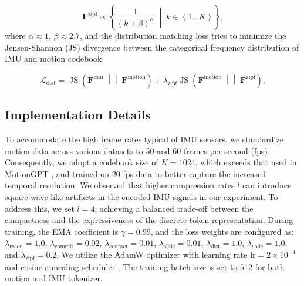 \begin{equation}
    \mathbf{F}^{\text{zipf}} \propto \left\{\frac{1}{(k+\beta)^\alpha} \;\middle|\; k\in\left\{1\dots K\right\}\right\}\text{,}
\label{eq:zipf_law}
\end{equation}
where $\alpha\approx 1$, $\beta\approx2.7$, and the distribution matching loss tries to minimize the Jensen-Shannon (JS) divergence between the categorical frequency distribution of IMU and motion codebook
\begin{small}
\begin{equation}
    \mathcal L_{\text{dist}} = \operatorname{JS}\left({\mathbf{F}^\text{imu}} \;\middle|\middle|\; {\mathbf{F}^{\text{motion}}}\right) + \lambda_{\text{zipf}}\operatorname{JS}\left({\mathbf{F}^\text{motion}} \;\middle|\middle|\; {\mathbf{F}^{\text{zipf}}}\right)\text{.}
\label{eq:distribution_matching}
\end{equation}
\end{small}

\subsection{Implementation Details}
\label{sec:implementation_detail_part1}
To accommodate the high frame rates typical of IMU sensors, we standardize motion data across various datasets to 50 and 60 frames per second (fps). Consequently, we adopt a codebook size of $K=1024$, which exceeds that used in MotionGPT \cite{jiang2023motiongpt}, and trained on 20 fps data to better capture the increased temporal resolution. We observed that higher compression rates $l$ can introduce square-wave-like artifacts in the encoded IMU signals in our experiment. To address this, we set $l=4$, achieving a balanced trade-off between the compactness and the expressiveness of the discrete token representation. During training, the EMA coefficient is $\gamma=0.99$, and the loss weights are configured as: $\lambda_{\textrm{recon}}=1.0$, $\lambda_{\textrm{commit}}=0.02$, $\lambda_{\textrm{contact}}=0.01$, $\lambda_{\textrm{slide}}=0.01$, $\lambda_{\textrm{dist}}=1.0$, $\lambda_{\textrm{code}}=1.0$, and $\lambda_{\textrm{zipf}}=0.2$.
We utilize the AdamW optimizer \cite{loshchilov2017decoupled} with learning rate $\textrm{lr}=2\times10^{-4}$ and cosine annealing scheduler \cite{loshchilov2016sgdr}. The training batch size is set to $512$ for both motion and IMU tokenizer.
